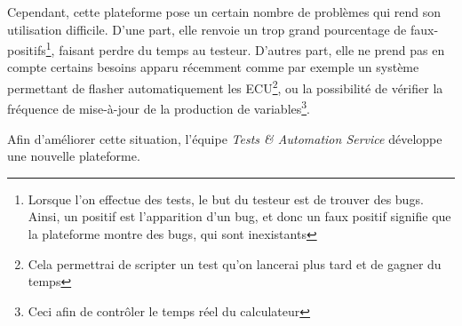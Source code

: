 			Cependant, cette plateforme pose un certain nombre de problèmes qui rend son utilisation difficile. D'une part, elle renvoie un trop grand pourcentage de faux-positifs\footnote{Lorsque l'on effectue des tests, le but du testeur est de trouver des bugs. Ainsi, un positif est l'apparition d'un bug, et donc un faux positif signifie que la plateforme montre des bugs, qui sont inexistants}, faisant perdre du temps au testeur. D'autres part, elle ne prend pas en compte certains besoins apparu récemment comme par exemple un système permettant de flasher automatiquement les ECU\footnote{Cela permettrai de scripter un test qu'on lancerai plus tard et de gagner du temps}, ou la possibilité de vérifier la fréquence de mise-à-jour de la production de variables\footnote{Ceci afin de contrôler le temps réel du calculateur}.
			
			Afin d'améliorer cette situation, l'équipe \textit{Tests \& Automation Service} développe une nouvelle plateforme.
			
